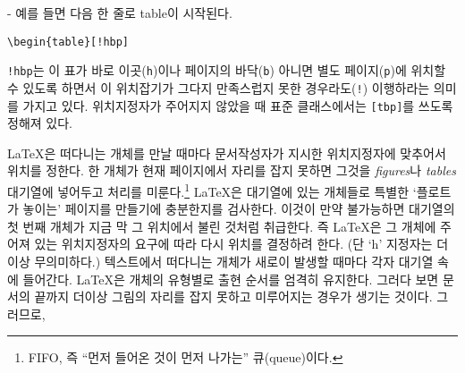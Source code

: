 \begin{adjustwidth}{0pt}{-\margheadwidth}
예를 들면 다음 한 줄로 table이 시작된다.
\begin{code}
\verb|\begin{table}[!hbp]|
\end{code}
\noindent {} \verb|!hbp|는 이 표가 바로 이곳(\texttt{h})이나 페이지의 바닥(\texttt{b})
아니면 별도 페이지(\texttt{p})에 위치할 수 있도록 하면서 이 위치잡기가 그다지 만족스럽지 못한 경우라도(\texttt{!})
이행하라는 의미를 가지고 있다. 위치지정자가 주어지지 않았을 때 표준 클래스에서는 \verb|[tbp]|를 쓰도록 정해져 있다.

\LaTeX 은 떠다니는 개체를 만날 때마다 문서작성자가 지시한 위치지정자에 맞추어서 위치를 정한다.
한 개체가 현재 페이지에서 자리를 잡지 못하면 그것을 \emph{figures}나 \emph{tables} 대기열에
넣어두고 처리를 미룬다.\footnote{FIFO, 즉 ``먼저 들어온 것이 먼저 나가는'' 큐(queue)이다.}
\LaTeX 은 대기열에 있는 개체들로 특별한 `플로트가 놓이는' 페이지를 만들기에 충분한지를 검사한다.
이것이 만약 불가능하면 대기열의 첫 번째 개체가 지금 막 그 위치에서 불린 것처럼 취급한다. 즉
\LaTeX 은 그 개체에 주어져 있는 위치지정자의 요구에 따라 다시 위치를 결정하려 한다. (단 `h'
지정자는 더이상 무의미하다.)
텍스트에서 떠다니는 개체가 새로이 발생할 때마다 각자 대기열 속에 들어간다.
\LaTeX 은 개체의 유형별로 출현 순서를 엄격히 유지한다. 그러다 보면 문서의 끝까지
더이상 그림의 자리를 잡지 못하고 미루어지는 경우가 생기는 것이다.
그러므로,


\end{adjustwidth}
